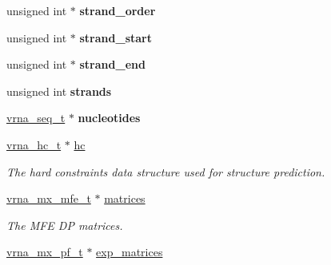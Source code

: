 \begin{Indent}
\begin{DoxyCompactItemize}
unsigned int $\ast$ {\bfseries strand\+\_\+order}
\item 
\mbox{\label{group__fold__compound_a571ee9a932f633c7d9167ae029573935}} 
unsigned int $\ast$ {\bfseries strand\+\_\+start}
\item 
\mbox{\label{group__fold__compound_aaa1b51bc6eb47cc661fea834d7175a54}} 
unsigned int $\ast$ {\bfseries strand\+\_\+end}
\item 
\mbox{\label{group__fold__compound_ad8962b97f5e5e233d9bfb5b16a691d26}} 
unsigned int {\bfseries strands}
\item 
\mbox{\label{group__fold__compound_a855b503aefd052430bf463d8518d2ff5}} 
\hyperlink{group__alphabet__utils_gaa35bee3061759495467070b47d0e1f22}{vrna\+\_\+seq\+\_\+t} $\ast$ {\bfseries nucleotides}
\item 
\mbox{\label{group__fold__compound_aceaa904dbf50092d403ca99422e8f824}} 
\hyperlink{group__hard__constraints_gac7e4c4f8abe3163a68110c5bff24e01d}{vrna\+\_\+hc\+\_\+t} $\ast$ \hyperlink{group__fold__compound_aceaa904dbf50092d403ca99422e8f824}{hc}
\begin{DoxyCompactList}\small\item\em The hard constraints data structure used for structure prediction. \end{DoxyCompactList}\item 
\mbox{\label{group__fold__compound_aca8be7bdc65bafe2172c6ee777f18568}} 
\hyperlink{group__dp__matrices_gae5aef35d016475e758f619b7bcb534f9}{vrna\+\_\+mx\+\_\+mfe\+\_\+t} $\ast$ \hyperlink{group__fold__compound_aca8be7bdc65bafe2172c6ee777f18568}{matrices}
\begin{DoxyCompactList}\small\item\em The M\+FE DP matrices. \end{DoxyCompactList}\item 
\mbox{\label{group__fold__compound_afc38ed5a1028a2712d2365274bf49727}} 
\hyperlink{group__dp__matrices_ga68729ab3fed26bdd1806fa814f172fc1}{vrna\+\_\+mx\+\_\+pf\+\_\+t} $\ast$ \hyperlink{group__fold__compound_afc38ed5a1028a2712d2365274bf49727}{exp\+\_\+matrices}

\end{DoxyCompactItemize}
\end{Indent}
